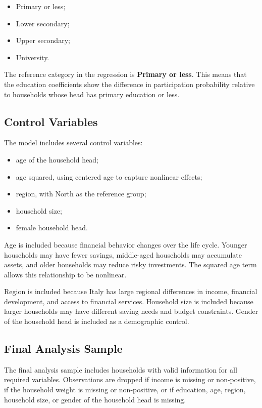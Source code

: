 \documentclass[12pt]{article}
\begin{document}
\begin{itemize}[leftmargin=*]
    \item Primary or less;
    \item Lower secondary;
    \item Upper secondary;
    \item University.
\end{itemize}

The reference category in the regression is \textbf{Primary or less}. This means that the education coefficients show the difference in participation probability relative to households whose head has primary education or less.

\subsection{Control Variables}

The model includes several control variables:

\begin{itemize}[leftmargin=*]
    \item age of the household head;
    \item age squared, using centered age to capture nonlinear effects;
    \item region, with North as the reference group;
    \item household size;
    \item female household head.
\end{itemize}

Age is included because financial behavior changes over the life cycle. Younger households may have fewer savings, middle-aged households may accumulate assets, and older households may reduce risky investments. The squared age term allows this relationship to be nonlinear.

Region is included because Italy has large regional differences in income, financial development, and access to financial services. Household size is included because larger households may have different saving needs and budget constraints. Gender of the household head is included as a demographic control.

\subsection{Final Analysis Sample}

The final analysis sample includes households with valid information for all required variables. Observations are dropped if income is missing or non-positive, if the household weight is missing or non-positive, or if education, age, region, household size, or gender of the household head is missing.
\end{document}
